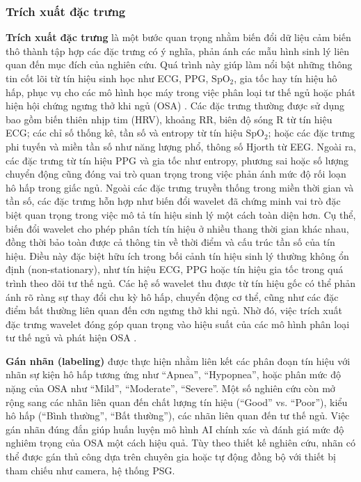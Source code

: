 \subsubsection{Trích xuất đặc trưng}
\textbf{Trích xuất đặc trưng} là một bước quan trọng nhằm biến đổi dữ liệu cảm biến
thô thành tập hợp các đặc trưng có ý nghĩa, phản ánh các mẫu hình sinh lý
liên quan đến mục đích của nghiên cứu. Quá trình này giúp làm nổi bật
những thông tin cốt lõi từ tín hiệu sinh học như ECG, PPG,
$\mathrm{SpO_2}$, gia tốc hay tín hiệu hô hấp, phục vụ cho các mô hình
học máy trong việc phân loại tư thế ngủ hoặc phát hiện hội chứng ngưng
thở khi ngủ (OSA) \cite{hstSurvey, HOANG2025116309, Channa_osa, Uday, Sang}.
Các đặc trưng thường được sử dụng bao gồm biến thiên
nhịp tim (HRV), khoảng RR, biên độ sóng R từ tín hiệu ECG; các chỉ số
thống kê, tần số và entropy từ tín hiệu $\mathrm{SpO_2}$; hoặc các đặc
trưng phi tuyến và miền tần số như năng lượng phổ, thông số Hjorth từ EEG.
Ngoài ra, các đặc trưng từ tín hiệu PPG và gia tốc như entropy, phương sai
hoặc số lượng chuyển động cũng đóng vai trò quan trọng trong việc phản ánh
mức độ rối loạn hô hấp trong giấc ngủ. Ngoài các đặc trưng truyền thống
trong miền thời gian và tần số, các đặc trưng hỗn hợp như biến đổi
wavelet đã chứng minh vai trò đặc biệt quan trọng trong việc mô tả
tín hiệu sinh lý một cách toàn diện hơn. Cụ thể, biến đổi wavelet
cho phép phân tích tín hiệu ở nhiều thang thời gian khác nhau, đồng thời
bảo toàn được cả thông tin về thời điểm và cấu trúc tần số của tín hiệu.
Điều này đặc biệt hữu ích trong bối cảnh tín hiệu sinh lý thường không
ổn định (non-stationary), như tín hiệu ECG, PPG hoặc tín hiệu gia tốc
trong quá trình theo dõi tư thế ngủ. Các hệ số wavelet thu được từ tín
hiệu gốc có thể phản ánh rõ ràng sự thay đổi chu kỳ hô hấp, chuyển động
cơ thể, cũng như các đặc điểm bất thường liên quan đến cơn ngưng thở khi
ngủ. Nhờ đó, việc trích xuất đặc trưng wavelet đóng góp quan trọng vào
hiệu suất của các mô hình phân loại tư thế ngủ và phát hiện OSA \cite{Sleep_Posture_Detection}.

\textbf{Gán nhãn (labeling)}
được thực hiện nhằm liên kết các phân đoạn tín hiệu với nhãn sự kiện
hô hấp tương ứng như “Apnea”, “Hypopnea”, hoặc phân mức độ nặng của OSA
như “Mild”, “Moderate”, “Severe”. Một số nghiên cứu còn mở rộng sang
các nhãn liên quan đến chất lượng tín hiệu (“Good” vs. “Poor”),
kiểu hô hấp (“Bình thường”, “Bất thường”), các nhãn liên quan đến tư thế ngủ.
Việc gán nhãn đúng đắn giúp huấn luyện mô hình
AI chính xác và đánh giá mức độ nghiêm trọng của OSA một cách hiệu quả.
Tùy theo thiết kế nghiên cứu, nhãn có thể được gán thủ công dựa trên
chuyên gia hoặc tự động đồng bộ với thiết bị tham chiếu như
camera, hệ thống PSG.

